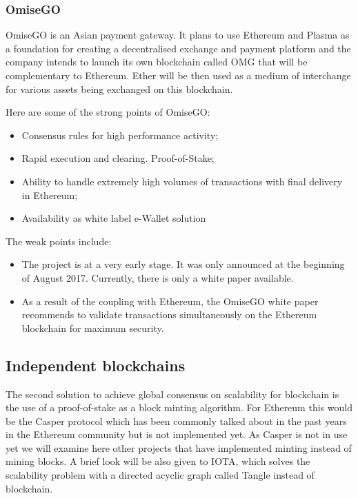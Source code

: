 \subsubsection{OmiseGO}
OmiseGO is an Asian payment gateway. It plans to use Ethereum and Plasma as a foundation for creating a decentralised exchange and payment platform \cite{OMG} and the company intends to launch its own blockchain called OMG that will be complementary to Ethereum. Ether will be then used as a medium of interchange for various assets being exchanged on this blockchain.

\medskip

Here are some of the strong points of OmiseGO:
\begin{itemize}
    \item Consensus rules for high performance activity;
    \item Rapid execution and clearing. Proof-of-Stake;
    \item Ability to handle extremely high volumes of transactions with final delivery in Ethereum;
    \item Availability as white label e-Wallet solution
\end{itemize}

The weak points include:
\begin{itemize}
    \item The project is at a very early stage. It was only announced at the beginning of August 2017. Currently, there is only a white paper available.
    \item As a result of the coupling with Ethereum, the OmiseGO white paper recommends to validate transactions simultaneously on the Ethereum blockchain for maximum security.
\end{itemize}

\subsection{Independent blockchains}
The second solution to achieve global consensus on scalability for blockchain is the use of a proof-of-stake as a block minting algorithm. For Ethereum this would be the Casper protocol which has been commonly talked about in the past years in the Ethereum community but is not implemented yet. As Casper is not in use yet we will examine here other projects that have implemented minting instead of mining blocks. A brief look will be also given to IOTA, which solves the scalability problem with a directed acyclic graph called Tangle instead of blockchain.


